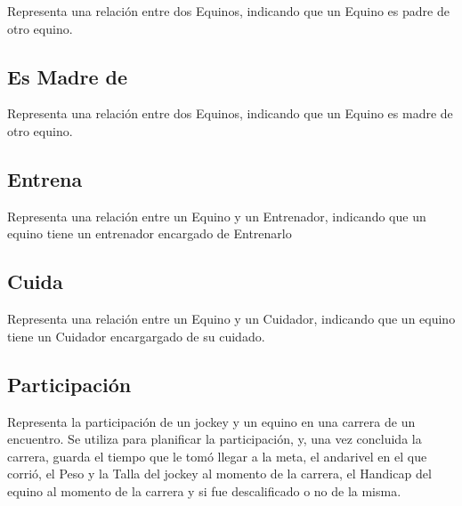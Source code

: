\documentclass[a4paper,11pt]{article}
\begin{document}
Representa una relación entre dos Equinos, indicando que un Equino es padre de otro equino.

\subsection{Es Madre de}

Representa una relación entre dos Equinos, indicando que un Equino es madre de otro equino.

\subsection{Entrena}

Representa una relación entre un Equino y un Entrenador, indicando que un equino tiene un
entrenador encargado de Entrenarlo

\subsection{Cuida}

Representa una relación entre un Equino y un Cuidador, indicando que un equino tiene un Cuidador
encargargado de su cuidado.

\subsection{Participación}

Representa la participación de un jockey y un equino en una carrera de un encuentro.
Se utiliza para planificar la participación, y, una vez concluida la carrera,  
guarda el tiempo que le tomó llegar a la meta, el andarivel en el que corrió,
el Peso y la Talla del jockey al momento de la carrera, el Handicap del equino
al momento de la carrera y si fue descalificado o no de la misma. 
\end{document}
